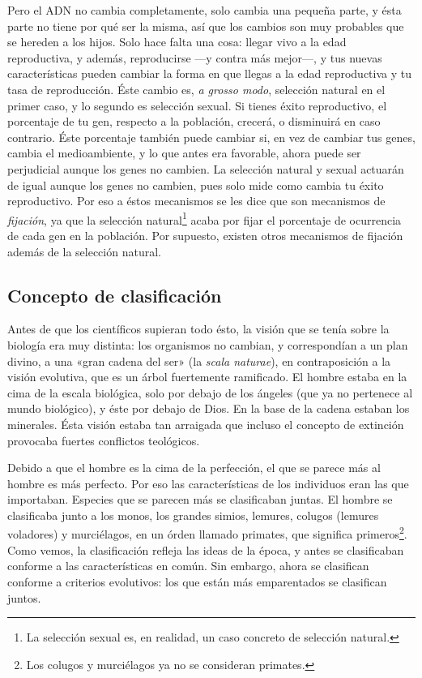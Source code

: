 Pero el ADN no cambia completamente, solo cambia una pequeña
parte, y ésta parte no tiene por qué ser la misma, así que los
cambios son muy probables que se hereden a los hijos. Solo hace falta
una cosa: llegar vivo a la edad reproductiva, y además, reproducirse
\----y contra más mejor\----,
y tus nuevas características pueden cambiar la forma en que llegas a
la edad reproductiva y tu tasa de
reproducción. Éste cambio es, \textit{a grosso modo}, selección
natural en el primer caso, y lo segundo es selección sexual. Si tienes éxito
reproductivo, el porcentaje de tu gen, respecto a la población,
crecerá, o disminuirá en caso contrario. Éste porcentaje también puede
cambiar si, en vez de cambiar tus genes, cambia el medioambiente, y lo que
antes era favorable, ahora puede ser perjudicial aunque los genes no
cambien. La selección natural y sexual actuarán de igual aunque los
genes no cambien, pues solo mide como cambia tu éxito
reproductivo. Por eso a éstos mecanismos se les dice que son
mecanismos de \textit{fijación}, ya que la selección
natural\footnote{La selección sexual es, en realidad, un caso
  concreto de selección natural.} acaba por fijar el porcentaje
de ocurrencia de cada gen en la población. Por
supuesto, existen otros mecanismos de fijación además de la selección
natural.

\subsection{Concepto de clasificación}
Antes de que los científicos supieran todo ésto, la visión que se
tenía sobre la biología era muy distinta: los organismos no cambian, y
correspondían a un plan divino, a una «gran cadena del ser» (la
\textit{scala naturae}), en contraposición a la visión evolutiva, que
es un árbol fuertemente ramificado. El hombre estaba en la cima de la
escala biológica, solo por debajo de los ángeles (que ya no pertenece
al mundo biológico), y éste por debajo de Dios. En la base de la
cadena estaban los minerales. Ésta visión estaba tan arraigada que
incluso el concepto de extinción provocaba fuertes conflictos
teológicos.

Debido a que el hombre es la cima de la perfección, el que se parece
más al hombre es más perfecto. Por eso las características de los
individuos eran las que importaban. Especies que se parecen más se
clasificaban juntas. El hombre se clasificaba junto a los monos, los
grandes simios, lemures, colugos (lemures voladores) y
murciélagos, en un órden llamado primates, que significa
primeros\footnote{Los colugos y murciélagos ya no se consideran
  primates.}. Como vemos, la clasificación refleja las ideas de la
época, y antes se clasificaban conforme a las características en
común. Sin embargo, ahora se clasifican conforme a criterios
evolutivos: los que están más emparentados se clasifican juntos.

